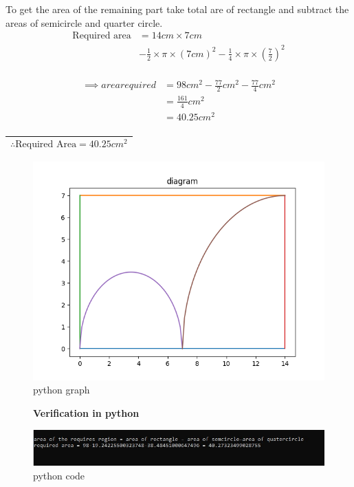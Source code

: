 \documentclass[journal,12pt,twocolumn]{IEEEtran}
\newcommand{\rectarea}[2]{#1 \times #2}
\newcommand{\semicirarea}[1]{\frac{1}{2} \times \pi \times (#1)^2}
\newcommand{\quatercirarea}[1]{\frac{1}{4} \times \pi \times (#1)^2}
\begin{document}
To get the area of the remaining part take total are of rectangle
and subtract the areas of semicircle and quarter circle.
\begin{align*}
    \text{Required area} &= \rectarea{14cm}{7cm} \\
                     &- \semicirarea{7cm} - \quatercirarea{\frac{7}{2}} \\
\end{align*}

   
\begin{align*}
\implies area required &=98cm^{2} - \frac{77}{2}cm^{2} - \frac{77}{4}cm^{2}\\ 
&= \frac{161}{4}cm^{2} \\
&= 40.25cm^{2}  \\
    \end{align*}

\begin{center}
\renewcommand{\arraystretch}{1.1}
\begin{tabular}{|c|}
\hline
    $$ \therefore \text{Required Area} = 40.25cm^2 $$ &\\
\hline
\end{tabular}
\end{center}

\begin{figure}
    \centering
    \includegraphics[scale = 0.6]{Figure_2.png}
    \caption{python graph}
    \label{fig:my_pythondiagram}
\end{figure}

\begin{figure}[b]
\begin{center}
\textbf{Verification in python}
\end{center}
    \centering
    \includegraphics[scale = 0.75]{Figure_3.jpg}
    \caption{python code}
    \label{fig:my_codeverification}
\end{figure}
\end{document}

